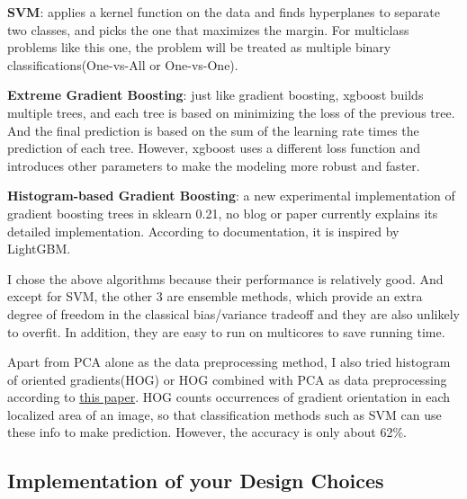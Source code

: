 \documentclass[12pt]{article}
\begin{document}
\textbf{SVM}: applies a kernel function on the data and finds hyperplanes to separate two classes, and picks the one that maximizes the margin. For multiclass problems like this one, the problem will be treated as multiple binary classifications(One-vs-All or One-vs-One).

\textbf{Extreme Gradient Boosting}: just like gradient boosting, xgboost builds multiple trees, and each tree is based on minimizing the loss of the previous tree. And the final prediction is based on the sum of the learning rate times the prediction of each tree. However, xgboost uses a different loss function and introduces other parameters to make the modeling more robust and faster.

\textbf{Histogram-based Gradient Boosting}: a new experimental implementation of gradient boosting trees in sklearn 0.21, no blog or paper currently explains its detailed implementation. According to documentation, it is inspired by LightGBM.

I chose the above algorithms because their performance is relatively good. And except for SVM, the other 3 are ensemble methods, which provide an extra degree of freedom in the classical bias/variance tradeoff and they are also unlikely to overfit. In addition, they are easy to run on multicores to save running time.

Apart from PCA alone as the data preprocessing method, I also tried histogram of oriented gradients(HOG) or HOG combined with PCA as data preprocessing according to \href{https://www.ijitee.org/wp-content/uploads/papers/v8i5/E3075038519.pdf}{this paper}. HOG counts occurrences of gradient orientation in each localized area of an image, so that classification methods such as SVM can use these info to make prediction. However, the accuracy is only about 62\%.

\subsection{Implementation of your Design Choices}
\end{document}
